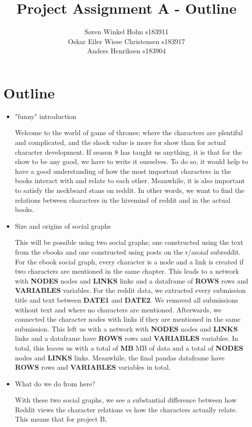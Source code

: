 \documentclass[]{article}
\title{Project Assignment A - Outline}
\author{Søren Winkel Holm s183911 \\ Oskar Eiler Wiese Christensen s183917 \\ Anders Henriksen s183904}
\begin{document}
	
	\maketitle
	
	\section*{Outline}
	\begin{itemize}
		\item "funny" introduction
		
		Welcome to the world of game of thrones; where the characters are plentiful and complicated, and the shock value is more for show than for actual character development. If season 8 has taught us anything, it is that for the show to be any good, we have to write it ourselves. To do so, it would help to have a good understanding of how the most important characters in the books interact with and relate to each other. Meanwhile, it is also important to satisfy the neckbeard stans on reddit. In other words, we want to find the relations between characters in the hivemind of reddit and in the actual books.
		
		\item Size and origins of social graphs
		
		This will be possible using two social graphs; one constructed using the text from the ebooks and one constructed using posts on the r/asoiaf subreddit. For the ebook social graph, every character is a node and a link is created if two characters are mentioned in the same chapter. This leads to a network with \textbf{NODES} nodes and \textbf{LINKS} links and a dataframe of \textbf{ROWS} rows and \textbf{VARIABLES} variables. For the reddit data, we extracted every submission title and text between \textbf{DATE1} and \textbf{DATE2}. We removed all submissions without text and where no characters are mentioned. Afterwards, we connected the character nodes with links if they are mentioned in the same submission. This left us with a network with \textbf{NODES} nodes and \textbf{LINKS} links and a dataframe have \textbf{ROWS} rows and \textbf{VARIABLES} variables. In total, this leaves us with a total of \textbf{MB} MB of data and a total of \textbf{NODES} nodes and \textbf{LINKS} links. Meanwhile, the final pandas dataframe have \textbf{ROWS} rows and \textbf{VARIABLES} variables in total.
		
		\item What do we do from here?
		
		With these two social graphs, we see a substantial difference between how Reddit views the character relations vs how the characters actually relate. This means that for project B, 
		
		
		
	\end{itemize}
\end{document}
